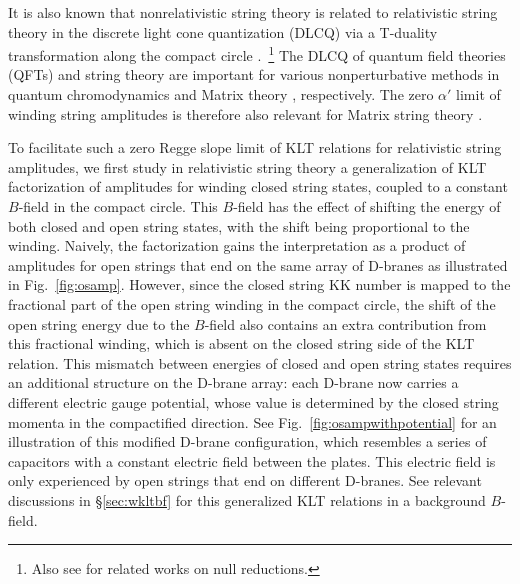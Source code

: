 \documentclass[11pt]{article}
\begin{document}
It is also known that nonrelativistic string theory is related to relativistic string theory in the discrete light cone quantization (DLCQ) via a T-duality transformation along the compact circle \cite{Gomis:2000bd, Danielsson:2000gi, Bergshoeff:2018yvt, Kluson:2018vfd, Bergshoeff:2019pij, Gomis:2020izd}.~\footnote{Also see \cite{Harmark:2017rpg, Kluson:2018egd, Harmark:2019upf, Harmark:2018cdl} for related works on null reductions.} The DLCQ of quantum field theories (QFTs) and string theory are important for various nonperturbative methods in quantum chromodynamics \cite{Brodsky1985} and Matrix theory \cite{Banks:1996vh}, respectively. The zero $\alpha'$ limit of winding string amplitudes is therefore also relevant for Matrix string theory \cite{Motl:1997th, Banks:1996my,Dijkgraaf:1997vv}.

To facilitate such a zero Regge slope limit of KLT relations for relativistic string amplitudes, we first study in relativistic string theory a generalization of KLT factorization of amplitudes for winding closed string states, coupled to a constant $B$-field in the compact circle.
This $B$-field has the effect of shifting the energy of both closed and open string states, with the shift being proportional to the winding. 
Naively, the factorization gains the interpretation as a product of amplitudes for open strings that end on the same array of D-branes as illustrated in Fig.~\ref{fig:osamp}. However, since the closed string KK number is mapped to the fractional part of the open string winding in the compact circle, the shift of the open string energy due to the $B$-field also contains an extra contribution from this fractional winding, which is absent on the closed string side of the KLT relation. This mismatch between energies of closed and open string states requires an additional structure on the D-brane array: each D-brane now carries a different electric gauge potential, whose value is determined by the closed string momenta in the compactified direction. See Fig.~\ref{fig:osampwithpotential} for an illustration of this modified D-brane configuration, which resembles a series of capacitors with a constant electric field between the plates. This electric field is only experienced by open strings that end on different D-branes. See relevant discussions in \S\ref{sec:wkltbf} for this generalized KLT relations in a background $B$-field.     
%
\end{document}
